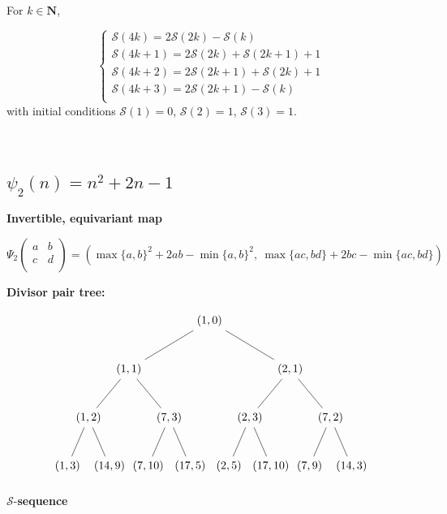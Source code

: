 \documentclass{article}
\begin{document}
\

For $k \in \mathbf{N}$,

$$
\begin{cases}
\mathcal{S}(4k) = 2\mathcal{S}(2k) - \mathcal{S}(k) \\
\mathcal{S}(4k+1) = 2\mathcal{S}(2k) + \mathcal{S}(2k+1) + 1 \\
\mathcal{S}(4k+2) =  2\mathcal{S}(2k+1) + \mathcal{S}(2k) + 1 \\
\mathcal{S}(4k+3) =  2\mathcal{S}(2k+1) - \mathcal{S}(k)  \\
\end{cases}
$$
with initial conditions $\mathcal{S}(1) = 0$, $\mathcal{S}(2) = 1$, $\mathcal{S}(3) = 1$.

\



\subsection{$\psi_2(n) = n^2 + 2n - 1$}

\textbf{Invertible, equivariant map}

$$\Psi_2 \begin{pmatrix}
    a & b \\
    c & d \\
\end{pmatrix} = 
(\max \{a, b\}^2 + 2ab - \min \{a, b \}^2,  \ \max \{ac, bd \} + 2bc - \min \{ac, bd\})$$

\textbf{Divisor pair tree:}

$$
\begin{tikzpicture}[level distance=15mm, 
                    level 1/.style={sibling distance=50mm},
                    level 2/.style={sibling distance=25mm},
                    level 3/.style={sibling distance=13mm}]
  \node {\((1, 0)\)}
    child {
      node {\((1, 1)\)} 
      child {
        node {\((1, 2)\)}
        child {node {\((1, 3)\)}}
        child {node {\((14, 9)\)}}
      }
      child {
        node {\((7, 3)\)}
        child {node {\((7, 10)\)}}
        child {node {\((17, 5)\)}}
      }
    }
    child {
      node {\((2, 1)\)}
      child {
        node {\((2, 3)\)}
        child {node {\((2, 5)\)}}
        child {node {\((17, 10)\)}}
      }
      child {
        node {\((7, 2)\)}
        child {node {\((7, 9)\)}}
        child {node {\((14, 3)\)}}
      } 
    };
\end{tikzpicture}
$$

$\mathcal{S}$-\textbf{sequence}
\end{document}

